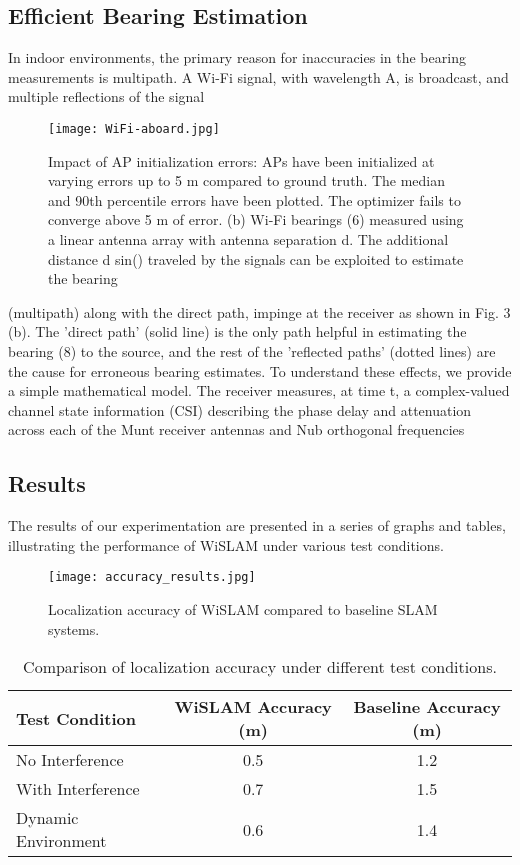 \documentclass[
	a4paper, %
	11pt, %
	unnumberedsections, %
	twoside, %
]{LTJournalArticle}
\begin{document}
\subsection{Efficient Bearing Estimation}
In indoor environments, the primary reason for inaccuracies in the bearing measurements is multipath. A Wi-Fi signal, with wavelength A, is broadcast, and multiple reflections of the signal

\begin{figure}[h]
    \centering
    \texttt{[image: WiFi-aboard.jpg]}
    \caption{Impact of AP initialization errors: APs have been initialized at varying errors up to 5 m compared to ground truth. The median and 90th percentile errors have been plotted. The optimizer fails to converge above 5 m of error. (b) Wi-Fi bearings (6) measured using a linear antenna array with antenna separation d. The additional distance d sin() traveled by the signals can be exploited to estimate the bearing}
    \label{fig:WiFi-aboard}
\end{figure}

(multipath) along with the direct path, impinge at the receiver as shown in Fig. 3 (b). The 'direct path' (solid line) is the only path helpful in estimating the bearing (8) to the source, and the rest of the 'reflected paths' (dotted lines) are the cause for erroneous bearing estimates.
To understand these effects, we provide a simple mathematical model. The receiver measures, at time t, a complex-valued channel state information (CSI) describing the phase delay and attenuation across each of the Munt receiver antennas and Nub orthogonal frequencies 

\subsection{Results}
The results of our experimentation are presented in a series of graphs and tables, illustrating the performance of WiSLAM under various test conditions.

\begin{figure*}[ht]
	\centering
	\texttt{[image: accuracy\_results.jpg]}
	\caption{Localization accuracy of WiSLAM compared to baseline SLAM systems.}
	\label{fig:accuracy_results}
\end{figure*}

\begin{table*}[ht]
	\centering
	\begin{tabular}{lcc}
		\toprule
		Test Condition & WiSLAM Accuracy (m) & Baseline Accuracy (m) \\
		\midrule
		No Interference & 0.5 & 1.2 \\
		With Interference & 0.7 & 1.5 \\
		Dynamic Environment & 0.6 & 1.4 \\
		\bottomrule
	\end{tabular}
	\caption{Comparison of localization accuracy under different test conditions.}
	\label{tab:accuracy_comparison}
\end{table*}
\end{document}
